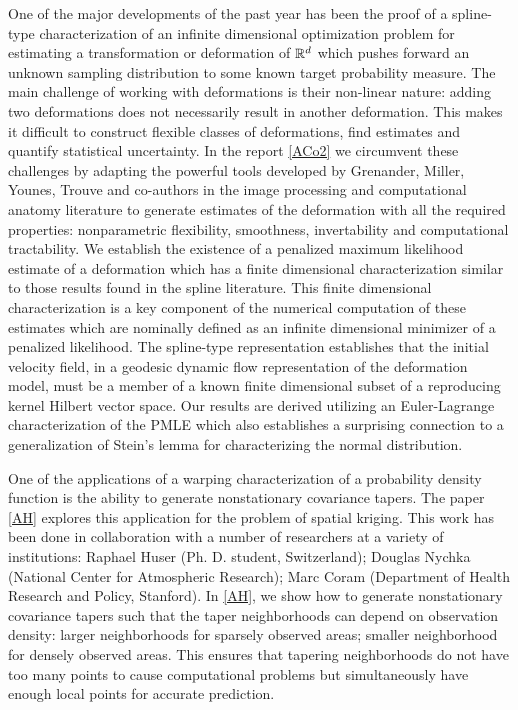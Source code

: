 \documentclass[12pt]{article}
\begin{document}
One of the major developments of the past year  has been the proof of a spline-type characterization of an infinite dimensional optimization problem for estimating a transformation or deformation of $\Bbb R^d$ which pushes forward an unknown sampling distribution to some known target probability measure. The main challenge of working with deformations is their non-linear nature: adding two deformations does not necessarily result in another deformation. This makes it difficult to construct flexible classes of deformations, find estimates and quantify statistical uncertainty.  In the report \ref{ACo2} we circumvent these challenges by adapting the powerful tools developed by Grenander, Miller, Younes, Trouve and co-authors in the image processing and computational anatomy literature to generate estimates of the deformation with all the required properties: nonparametric flexibility, smoothness, invertability and computational tractability. We establish the existence of a penalized maximum likelihood estimate of a deformation which has a finite dimensional characterization similar to those results found in the spline literature. This finite dimensional characterization is a key component of the numerical computation of these estimates which are nominally defined as an infinite dimensional minimizer of a penalized likelihood. The spline-type representation establishes that the initial velocity field, in a geodesic dynamic flow representation of the deformation model, must be a member of a known finite dimensional subset of a reproducing kernel Hilbert vector space. Our results are derived utilizing an Euler-Lagrange characterization of the PMLE which also establishes a surprising connection to a generalization of Stein's lemma for characterizing the normal distribution.


One of the applications of a warping characterization of a probability density function is the ability to generate  nonstationary  covariance tapers. The paper \ref{AH} explores this application for the problem of spatial kriging.
This work has been done in collaboration with a number of researchers at a variety of institutions:  Raphael Huser (Ph. D. student, Switzerland); Douglas Nychka (National Center for Atmospheric Research); Marc Coram (Department of Health Research and Policy, Stanford). In \ref{AH}, we show how to  generate  nonstationary  covariance tapers such that the taper neighborhoods can depend on observation density: larger neighborhoods for sparsely observed areas; smaller neighborhood for densely observed areas. This  ensures that tapering neighborhoods do not have too many points to cause computational problems but simultaneously have enough local points for accurate prediction.
\end{document}
